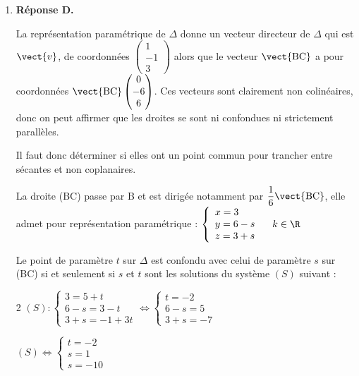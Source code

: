 \begin{enumerate}
H est donc le point $M_{-5}$ qui a comme coordonnées : $(8+(-5)~;~-3-2\times (-5)~;~-8-2\times (-5))$, soit $(3 ~;~ 7 ~;~ 2)$.
	\item \textbf{Réponse D.}

La représentation paramétrique de $\Delta$ donne un vecteur directeur de $\Delta$ qui est $\vect{v}$, de coordonnées $\begin{pmatrix}1\\-1\\3\end{pmatrix}$ alors que le vecteur $\vect{\mathrm{BC}}$ a pour coordonnées $\vect{\mathrm{BC}}\begin{pmatrix}0\\-6\\6\end{pmatrix}$. Ces vecteurs sont clairement non colinéaires, donc on peut affirmer que les droites se sont ni confondues ni strictement parallèles.

Il faut donc déterminer si elles ont un point commun pour trancher entre sécantes et non coplanaires.

La droite (BC) passe par B et est dirigée notamment par $\dfrac{1}{6}\vect{\mathrm{BC}}$, elle admet pour représentation paramétrique : $\left\{\begin{array}{l} x=3\\y=6-s\\z=3+s \end{array}\right. \quad k \in \R$

Le point de paramètre $t$ sur $\Delta$ est confondu avec celui de paramètre $s$ sur (BC) si et seulement si $s$ et $t$ sont les solutions du système $(S)$ suivant :

\setlength{\columnseprule}{0.8pt}
\begin{multicols}{2}
$(S) : \left\{\begin{array}{l} 3 = 5+t\\6-s=3-t\\3+s=-1+3t \end{array}\right.
\iff \left\{\begin{array}{l} t = -2\\6-s=5\\3+s=-7 \end{array}\right.	$

$(S) \iff  \left\{\begin{array}{l} t = -2\\s=1\\s=-10 \end{array}\right.$
	\end{multicols}


\end{enumerate}
